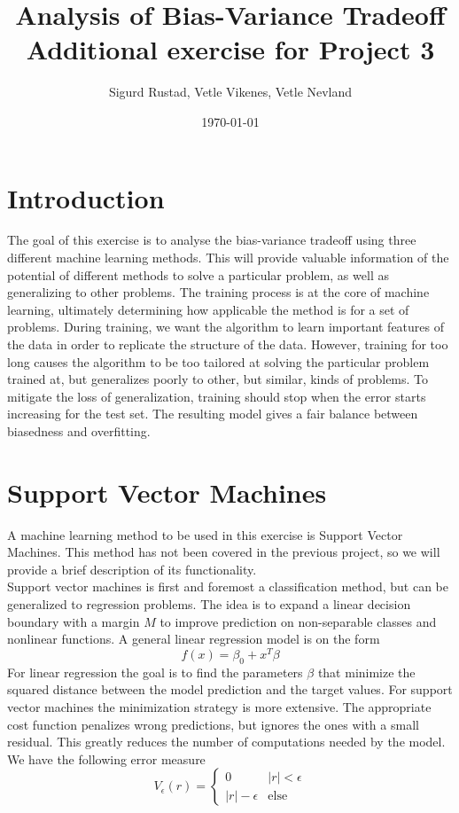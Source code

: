 \documentclass[a4paper]{article}
\begin{document}
	\title{\textbf{\huge{Analysis of Bias-Variance Tradeoff}\\ \large{Additional exercise for Project 3}}}
	
	\author{\textbf\large{Sigurd Rustad, Vetle Vikenes, Vetle Nevland}}
	
	\date{\today}
	
	
	\maketitle
	
	
	\section{Introduction}
	The goal of this exercise is to analyse the bias-variance tradeoff using three different machine learning methods. This will provide valuable information of the potential of different methods to solve a particular problem, as well as generalizing to other problems. The training process is at the core of machine learning, ultimately determining how applicable the method is for a set of problems. During training, we want the algorithm to learn important features of the data in order to replicate the structure of the data. However, training for too long causes the algorithm to be too tailored at solving the particular problem trained at, but generalizes poorly to other, but similar, kinds of problems. To mitigate the loss of generalization, training should stop when the error starts increasing for the test set. The resulting model gives a fair balance between biasedness and overfitting.
	
	\section{Support Vector Machines}
	A machine learning method to be used in this exercise is Support Vector Machines. This method has not been covered in the previous project, so we will provide a brief description of its functionality. \\
	
	Support vector machines is first and foremost a classification method, but can be generalized to regression problems. The idea is to expand a linear decision boundary with a margin $M$ to improve prediction on non-separable classes and nonlinear functions. A general linear regression model is on the form
	\[ f(x) = \beta_0 + x^T\beta \]
	For linear regression the goal is to find the parameters $\beta$ that minimize the squared distance between the model prediction and the target values. For support vector machines the minimization strategy is more extensive. The appropriate cost function penalizes wrong predictions, but ignores the ones with a small residual. This greatly reduces the number of computations needed by the model. We have the following error measure
	\[ V_{\epsilon}(r) = \begin{cases}
		0 & |r| < \epsilon \\
		|r| - \epsilon & \text{else}
	\end{cases} \]
	
\end{document}
